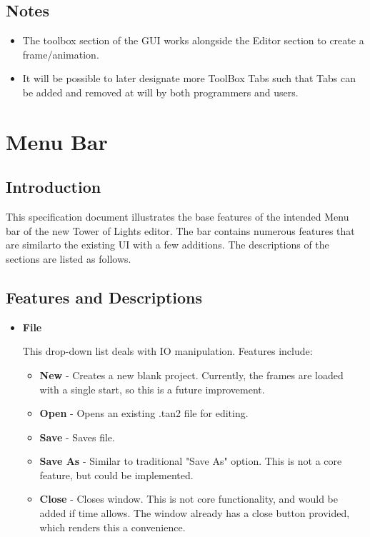 \documentclass[12pt]{extarticle}
\begin{document}
	
	\subsection{Notes}
	\begin{itemize}
		\item The toolbox section of the GUI works alongside the Editor section to create a frame/animation. 

		\item It will be possible to later designate more ToolBox Tabs such that Tabs can be added and removed at will by both programmers and users.
	\end{itemize}


\clearpage
\section{Menu Bar}



\subsection{Introduction}

{This specification document illustrates the base features of the intended Menu bar of the new Tower of Lights editor. The bar contains numerous features that are similarto the existing UI with a few additions. The descriptions of the sections are listed as follows.}

\subsection{Features and Descriptions}

\begin{itemize}
\item \textbf{File}

{This drop-down list deals with IO manipulation. Features include:}

	\begin{itemize}
	\item \textbf{New} - Creates a new blank project. Currently, the frames are loaded with a single start, so this is a future improvement.
	\item \textbf{Open} - Opens an existing .tan2 file for editing.
	\item \textbf{Save} - Saves file.
	\item \textbf{Save As} - Similar to traditional "Save As" option.  This is not a core feature, but could be implemented.
	\item \textbf{Close} - Closes window.   This is not core functionality, and would be added if time allows.  The window already has a close button provided, which renders this a convenience.


	\end{itemize}


\end{itemize}
\end{document}
